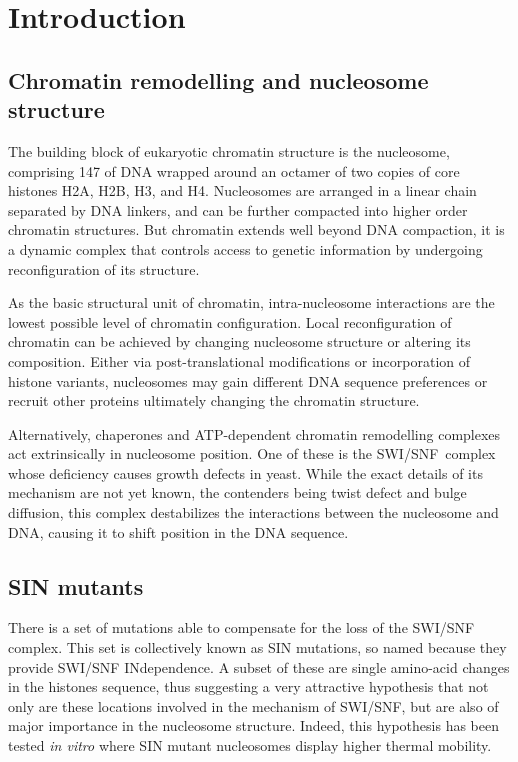 \section{Introduction}

  \subsection{Chromatin remodelling and nucleosome structure}

    The building block of eukaryotic chromatin structure is the nucleosome, comprising
    \SI{147}{\bp} of DNA wrapped around an octamer of two copies of core histones H2A,
    H2B, H3, and H4. Nucleosomes are arranged in a linear chain separated by DNA linkers, and
    can be further compacted into higher order chromatin structures. But chromatin extends
    well beyond DNA compaction, it is a dynamic complex that controls access to genetic
    information by undergoing reconfiguration of its structure.

    As the basic structural unit of chromatin, intra-nucleosome interactions
    are the lowest possible level of chromatin configuration. Local reconfiguration
    of chromatin can be achieved by changing nucleosome structure or altering
    its composition. Either via post-translational modifications or incorporation
    of histone variants, nucleosomes may gain different DNA sequence preferences
    or recruit other proteins ultimately changing the chromatin structure.

    Alternatively, chaperones and ATP-dependent chromatin remodelling complexes
    act extrinsically in nucleosome position. One of these is the SWI/SNF~complex
    whose deficiency causes growth defects in yeast. While the exact details of
    its mechanism are not yet known, the contenders being twist defect and
    bulge diffusion, this complex destabilizes the interactions between the
    nucleosome and DNA, causing it to shift position in the DNA sequence.

  \subsection{SIN mutants}

    There is a set of mutations able to compensate for the loss of the SWI/SNF
    complex. This set is collectively known as SIN mutations, so named because
    they provide SWI/SNF INdependence. A subset of these are single
    amino-acid changes in the histones sequence, thus suggesting a very
    attractive hypothesis that not only are these locations involved in the
    mechanism of SWI/SNF, but are also of major importance in the nucleosome
    structure. Indeed, this hypothesis has been tested \textit{in vitro}
    where SIN mutant nucleosomes display higher thermal mobility.

